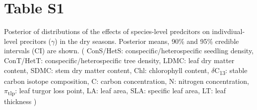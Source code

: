 \documentclass[
  12pt,
  letterpaper,
  DIV=11,
  numbers=noendperiod]{scrartcl}
\author{}
\date{}
\begin{document}
\ifdefined\Shaded\renewenvironment{Shaded}{\begin{tcolorbox}[breakable, borderline west={3pt}{0pt}{shadecolor}, frame hidden, boxrule=0pt, interior hidden, enhanced, sharp corners]}{\end{tcolorbox}}\fi

\hypertarget{table-s1}{%
\section{Table S1}\label{table-s1}}

Posterior of distributions of the effects of species-level predcitors on
indivdiual-level precitors (\(\gamma\)) in the dry seasons. Posterior
means, 90\% and 95\% credible intervals (CI) are shown. ( ConS/HetS:
conspecific/heterospecific seedling density, ConT/HetT:
conspecific/heterospecific tree density, LDMC: leaf dry matter content,
SDMC: stem dry matter content, Chl: chlorophyll content,
\(\delta\)C\textsubscript{13}: stable carbon isotope composition, C:
carbon concentration, N: nitrogen concentration,
\(\pi\)\textsubscript{tlp}: leaf turgor loss point, LA: leaf area, SLA:
specific leaf area, LT: leaf thickness )
\end{document}
